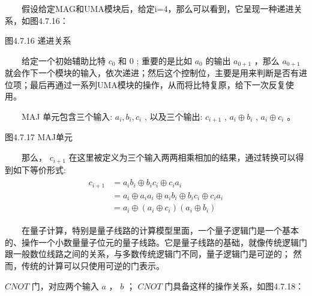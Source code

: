 \documentclass[a4paper,11pt,english]{sphinxmanual}
\let\sphinxpxdimen\pdfpxdimen\else\newdimen\sphinxpxdimen
\begin{document}
\sphinxAtStartPar
  假设给定MAG和UMA模块后，给定i=4，那么可以看到，它呈现一种递进关系，如图4.7.16：


\begin{center}图4.7.16 递进关系
\end{center}
\sphinxAtStartPar
  给定一个初始辅助比特  \(c_{0}\) 和 0 ; 重要的是比如  \(a_{0}\) 的输出  \(a_{0+1}\) ，那么  \(a_{0+1}\) 就会作下一个模块的输入，依次递进；然后这个控制位，主要是用来判断是否有进位项；最后再通过一系列UMA模块的操作，从而将比特复原，给下一次反复使用。

\sphinxAtStartPar
{}

\sphinxAtStartPar
  MAJ 单元包含三个输入:  \(a_{i}, b_{i}, c_{i}\) , 以及三个输出:  \(c_{i+1}\) , \(a_{i} \oplus b_{i}\) , \(a_{i} \oplus c_{i}\) 。

\noindent{\hspace*{\fill}\sphinxincludegraphics[width=400\sphinxpxdimen]{{4.7.17}.png}\hspace*{\fill}}

\begin{center}图4.7.17 MAJ单元
\end{center}
\sphinxAtStartPar
  那么， \(c_{i+1}\) 在这里被定义为三个输入两两相乘相加的结果，通过转换可以得到如下等价形式:
\begin{equation*}
\begin{split}\begin{aligned} c_{i+1} &=a_{i} b_{i} \oplus b_{i} c_{i} \oplus c_{i} a_{i} \\ &=a_{i} \oplus a_{i} a_{i} \oplus a_{i} b_{i} \oplus b_{i} c_{i} \oplus c_{i} a_{i} \\ &=a_{i} \oplus\left(a_{i} \oplus c_{i}\right)\left(a_{i} \oplus b_{i}\right) \end{aligned}\end{split}
\end{equation*}
\sphinxAtStartPar
{}

\sphinxAtStartPar
  在量子计算，特别是量子线路的计算模型里面，一个量子逻辑门是一个基本的、操作一个小数量量子位元的量子线路。它是量子线路的基础，就像传统逻辑门跟一般数位线路之间的关系，与多数传统逻辑门不同，量子逻辑门是可逆的； 然而，传统的计算可以只使用可逆的门表示。

\sphinxAtStartPar
\(CNOT\) 门，对应两个输入 \(a\) ， \(b\) ； \(CNOT\) 门具备这样的操作关系，如图4.7.18：
\end{document}
